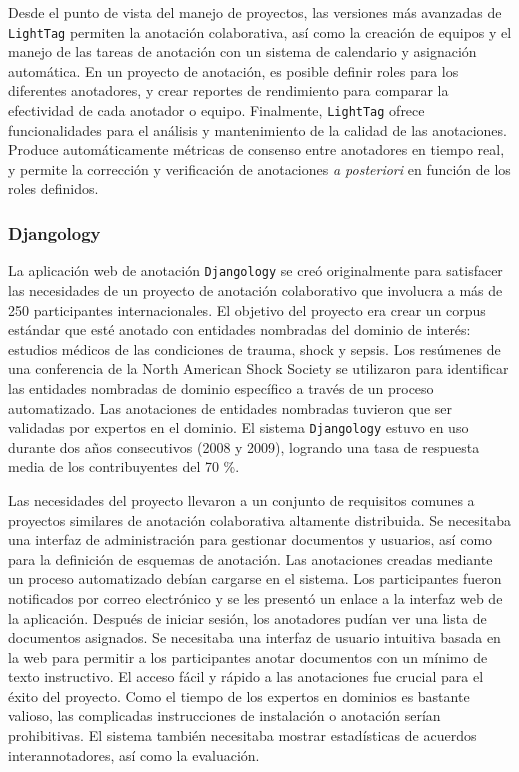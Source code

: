 Desde el punto de vista del manejo de proyectos, las versiones más avanzadas de \texttt{LightTag} permiten la anotación colaborativa, así como la creación de equipos y el manejo de las tareas de anotación con un sistema de calendario y asignación automática.
En un proyecto de anotación, es posible definir roles para los diferentes anotadores, y crear reportes de rendimiento para comparar la efectividad de cada anotador o equipo.
Finalmente, \texttt{LightTag} ofrece funcionalidades para el análisis y mantenimiento de la calidad de las anotaciones.
Produce automáticamente métricas de consenso entre anotadores en tiempo real, y permite la corrección y verificación de anotaciones \textit{a posteriori} en función de los roles definidos.

\subsubsection*{Djangology}

La aplicación web de anotación \texttt{Djangology} se creó originalmente para satisfacer las necesidades de un proyecto de anotación colaborativo que involucra a más de 250 participantes internacionales.
El objetivo del proyecto era crear un corpus estándar que esté anotado con entidades nombradas del dominio de interés: estudios médicos de las condiciones de trauma, shock y sepsis.
Los resúmenes de una conferencia de la North American Shock Society se utilizaron para identificar las entidades nombradas de dominio específico a través de un proceso automatizado.
Las anotaciones de entidades nombradas tuvieron que ser validadas por expertos en el dominio.
El sistema \texttt{Djangology} estuvo en uso durante dos años consecutivos (2008 y 2009), logrando una tasa de respuesta media de los contribuyentes del 70 \%.

Las necesidades del proyecto llevaron a un conjunto de requisitos comunes a proyectos similares de anotación colaborativa altamente distribuida.
Se necesitaba una interfaz de administración para gestionar documentos y usuarios, así como para la definición de esquemas de anotación.
Las anotaciones creadas mediante un proceso automatizado debían cargarse en el sistema.
Los participantes fueron notificados por correo electrónico y se les presentó un enlace a la interfaz web de la aplicación.
Después de iniciar sesión, los anotadores pudían ver una lista de documentos asignados.
Se necesitaba una interfaz de usuario intuitiva basada en la web para permitir a los participantes anotar documentos con un mínimo de texto instructivo.
El acceso fácil y rápido a las anotaciones fue crucial para el éxito del proyecto.
Como el tiempo de los expertos en dominios es bastante valioso, las complicadas instrucciones de instalación o anotación serían prohibitivas.
El sistema también necesitaba mostrar estadísticas de acuerdos interannotadores, así como la evaluación.

